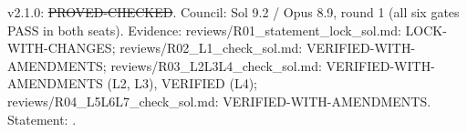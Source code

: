 \begin{theorem}\label{reg:W2-FAC-A_Thm-FAC-L}
\end{theorem}
\begin{statusbox}
 v2.1.0: \st{PROVED-CHECKED}. Council: Sol 9.2 / Opus 8.9, round 1 (all six gates PASS in both seats). Evidence: reviews/R01\_statement\_lock\_sol.md: LOCK-WITH-CHANGES; reviews/R02\_L1\_check\_sol.md: VERIFIED-WITH-AMENDMENTS; reviews/R03\_L2L3L4\_check\_sol.md: VERIFIED-WITH-AMENDMENTS (L2, L3), VERIFIED (L4); reviews/R04\_L5L6L7\_check\_sol.md: VERIFIED-WITH-AMENDMENTS. Statement: .
\end{statusbox}
